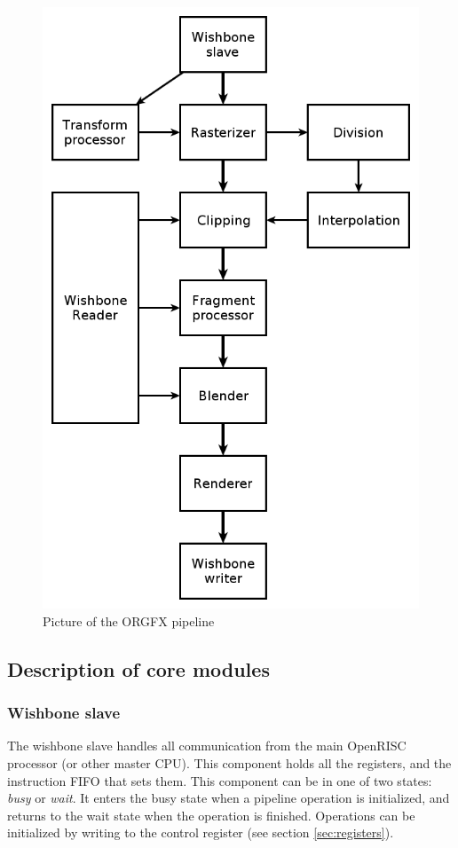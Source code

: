 \documentclass[10pt,a4paper]{article}
\begin{document}
\begin{figure}
\begin{center}
\includegraphics[scale=0.35]{../pictures/pipeline}
\caption{Picture of the ORGFX pipeline}
\label{fig:pipeline}
\end{center}
\end{figure}

\subsection{Description of core modules}

\subsubsection{Wishbone slave}
The wishbone slave handles all communication from the main OpenRISC processor (or other master CPU). This component holds all the registers, and the instruction FIFO that sets them. This component can be in one of two states: \textit{busy} or \textit{wait}. It enters the busy state when a pipeline operation is initialized, and returns to the wait state when the operation is finished. Operations can be initialized by writing to the control register (see section \ref{sec:registers}).
\end{document}
